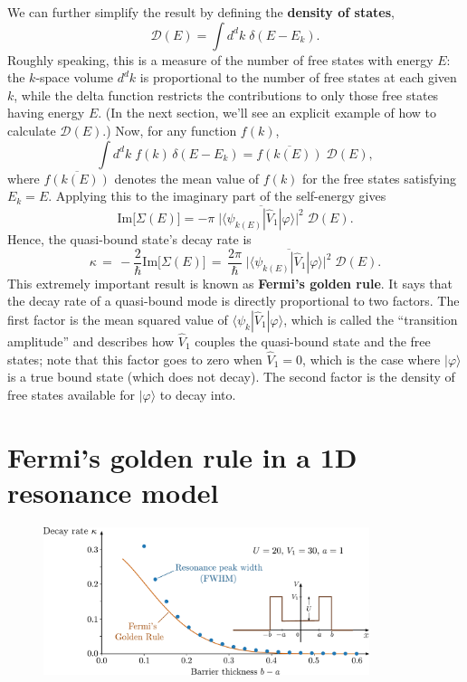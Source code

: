 \documentclass[pra,12pt]{revtex4}
\begin{document}
We can further simplify the result by defining the \textbf{density of
  states},
$$\mathcal{D}(E) = \int d^d k\; \delta(E - E_k).$$
Roughly speaking, this is a measure of the number of free states with
energy $E$: the $k$-space volume $d^dk$ is proportional to the number
of free states at each given $k$, while the delta function restricts
the contributions to only those free states having energy $E$.  (In
the next section, we'll see an explicit example of how to calculate
$\mathcal{D}(E)$.)  Now, for any function $f(k)$,
$$\int d^d k\; f(k) \, \delta(E - E_k) = \overline{f(k(E))} \;\mathcal{D}(E),$$
where $\overline{f(k(E))}$ denotes the mean value of $f(k)$ for the
free states satisfying $E_k = E$.  Applying this to the imaginary part
of the self-energy gives
$$\mathrm{Im}\big[\Sigma(E)\big] = - \pi \; \overline{\Big| \langle\psi_{k(E)}| \hat{V}_1|\varphi\rangle\Big|^2} \; \mathcal{D}(E).$$
Hence, the quasi-bound state's decay rate is
$$\boxed{\quad\kappa \,=\, -\frac{2}{\hbar}\mathrm{Im}\big[\Sigma(E)\big] \,=\, \frac{2\pi}{\hbar} \; \overline{\Big| \langle\psi_{k(E)}| \hat{V}_1|\varphi\rangle\Big|^2} \; \mathcal{D}(E).\quad}$$
This extremely important result is known as \textbf{Fermi's golden
  rule}.  It says that the decay rate of a quasi-bound mode is
directly proportional to two factors.  The first factor is the mean
squared value of $\langle\psi_{k}| \hat{V}_1|\varphi\rangle$, which is
called the ``transition amplitude'' and describes how $\hat{V}_1$
couples the quasi-bound state and the free states; note that this
factor goes to zero when $\hat{V}_1 = 0$, which is the case where
$|\varphi\rangle$ is a true bound state (which does not decay).  The
second factor is the density of free states available for
$|\varphi\rangle$ to decay into.

\section{Fermi's golden rule in a 1D resonance model}

\begin{figure}[h]
  \centering\includegraphics[width=0.85\textwidth]{goldenrule}
\end{figure}
\end{document}

